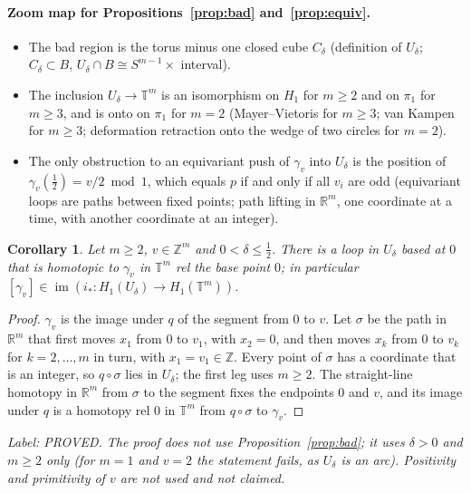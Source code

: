 \documentclass[11pt]{article}
\newtheorem{corollary}[theorem]{Corollary}
\theoremstyle{remark}
\newcommand{\Z}{\mathbb{Z}}
\newcommand{\R}{\mathbb{R}}
\newcommand{\lab}[1]{\par\smallskip\noindent\textit{Label: #1.}}
\begin{document}
\paragraph{Zoom map for Propositions~\ref{prop:bad} and~\ref{prop:equiv}.}
\begin{itemize}
\item[L1.1] The bad region is the torus minus one closed cube $C_\delta$ (definition of $U_\delta$; $C_\delta\subset B$, $U_\delta\cap B\cong S^{m-1}\times$ interval).
\item[L1.2] The inclusion $U_\delta\to\mathbb T^m$ is an isomorphism on $H_1$ for $m\ge2$ and on $\pi_1$ for $m\ge3$, and is onto on $\pi_1$ for $m=2$ (Mayer--Vietoris for $m\ge3$; van Kampen for $m\ge3$; deformation retraction onto the wedge of two circles for $m=2$).
\item[L1.3] The only obstruction to an equivariant push of $\gamma_v$ into $U_\delta$ is the position of $\gamma_v(\frac12)=v/2\bmod1$, which equals $p$ if and only if all $v_i$ are odd (equivariant loops are paths between fixed points; path lifting in $\R^m$, one coordinate at a time, with another coordinate at an integer).
\end{itemize}

\begin{corollary}\label{cor:vac}
Let $m\ge2$, $v\in\Z^m$ and $0<\delta\le\frac12$. There is a loop in $U_\delta$ based at $0$ that is homotopic to $\gamma_v$ in $\mathbb T^m$ rel the base point $0$; in particular $[\gamma_v]\in\operatorname{im}(i_*:H_1(U_\delta)\to H_1(\mathbb T^m))$.
\end{corollary}
\begin{proof}
$\gamma_v$ is the image under $q$ of the segment from $0$ to $v$. Let $\sigma$ be the path in $\R^m$ that first moves $x_1$ from $0$ to $v_1$, with $x_2=0$, and then moves $x_k$ from $0$ to $v_k$ for $k=2,\dots,m$ in turn, with $x_1=v_1\in\Z$. Every point of $\sigma$ has a coordinate that is an integer, so $q\circ\sigma$ lies in $U_\delta$; the first leg uses $m\ge2$. The straight-line homotopy in $\R^m$ from $\sigma$ to the segment fixes the endpoints $0$ and $v$, and its image under $q$ is a homotopy rel $0$ in $\mathbb T^m$ from $q\circ\sigma$ to $\gamma_v$.
\end{proof}
\lab{PROVED. The proof does not use Proposition~\ref{prop:bad}; it uses $\delta>0$ and $m\ge2$ only (for $m=1$ and $v=2$ the statement fails, as $U_\delta$ is an arc). Positivity and primitivity of $v$ are not used and not claimed}
\end{document}
